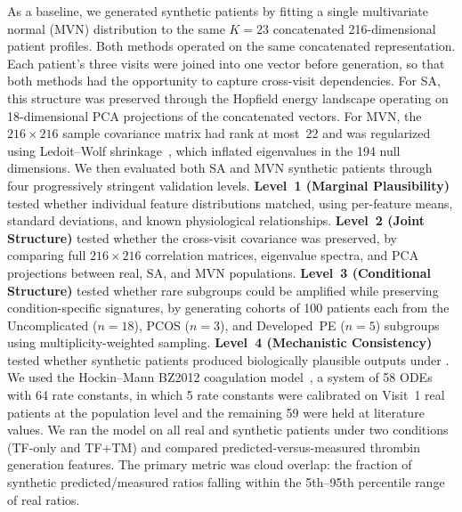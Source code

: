 As a baseline, we generated synthetic patients by fitting a single multivariate
normal (MVN) distribution to the same $K{=}23$ concatenated 216-dimensional patient
profiles. Both methods operated on the same concatenated
representation. Each patient's three visits were joined into one vector before
generation, so that both methods had the opportunity to capture cross-visit
dependencies. For SA, this structure was preserved through the Hopfield energy
landscape operating on 18-dimensional PCA projections of the concatenated vectors.
For MVN, the $216 \times 216$ sample covariance matrix had rank at most~22 and was
regularized using Ledoit--Wolf shrinkage~\citep{Ledoit2004}, which inflated
eigenvalues in the 194 null dimensions.
We then evaluated both SA and MVN synthetic patients through four progressively stringent
validation levels.
\textbf{Level~1 (Marginal Plausibility)} tested whether individual feature
distributions matched, using per-feature means, standard deviations, and known
physiological relationships. \textbf{Level~2 (Joint Structure)} tested whether the
cross-visit covariance was preserved, by comparing full $216 \times 216$ correlation
matrices, eigenvalue spectra, and PCA projections between real, SA, and MVN
populations. \textbf{Level~3 (Conditional Structure)} tested whether rare subgroups
could be amplified while preserving condition-specific signatures, by generating
cohorts of 100 patients each from the Uncomplicated ($n{=}18$), PCOS ($n{=}3$), and
Developed~PE ($n{=}5$) subgroups using multiplicity-weighted sampling. \textbf{Level~4 (Mechanistic
Consistency)} tested whether synthetic patients produced biologically plausible
outputs under . We used the Hockin--Mann BZ2012
coagulation model~\citep{Hockin2002,BrummelZiedins2012}, a system of 58 ODEs with 64 rate
constants, in which 5 rate constants were calibrated on Visit~1 real patients at the
population level and the remaining 59 were held at literature values. We ran the model
on all real and synthetic patients under two conditions (TF-only and TF+TM) and
compared predicted-versus-measured thrombin generation features. The primary metric
was cloud overlap: the fraction of synthetic predicted/measured ratios falling
within the 5th--95th percentile range of real ratios.

